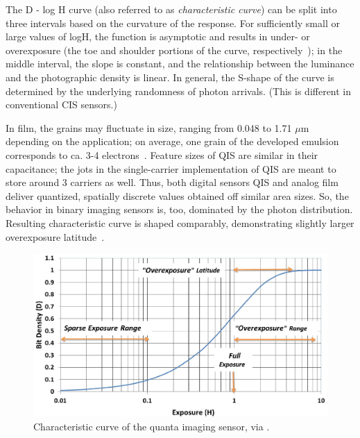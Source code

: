 The D - log H curve (also referred to as \textit{ characteristic curve}) can be split into three intervals based on the curvature of the response. For sufficiently small or large values of logH, the function is asymptotic and results in under- or overexposure (the toe and shoulder portions of the curve, respectively~\cite{Hunt2005}); in the middle interval, the slope is constant, and the relationship between the luminance and the photographic density is linear. %
In general, the S-shape of the curve is determined by the underlying randomness of photon arrivals. (This is different in conventional CIS sensors.)

In film, the grains may fluctuate in size, ranging from 0.048 to 1.71 $\mu$m depending on the application; on average, one grain of the developed emulsion corresponds to ca. 3-4 electrons~\cite{Carroll1980, FossumSiMulQIS}. Feature sizes of QIS are similar in their capacitance; the jots in the single-carrier implementation of QIS are meant to store around 3 carriers as well. Thus, both digital sensors QIS and analog film deliver quantized, spatially discrete values obtained off similar area sizes. So, the behavior in binary imaging sensors is, too, dominated by the photon distribution. Resulting characteristic curve is shaped comparably, demonstrating slightly larger overexposure latitude~\cite{FossumSiMulQIS}.

\begin{figure}[h]
  \centering
  \includegraphics[width=\linewidth]{imgs/film/qiscurve.png}
  \caption{Characteristic curve of the quanta imaging sensor, via \cite{fossum2016quanta}.}
  \label{fig:qiscurve}
\end{figure}

